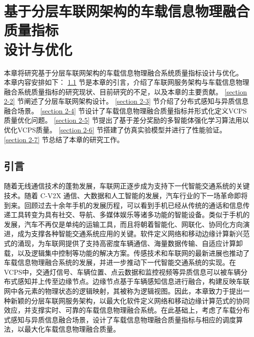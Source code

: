 \chapter[基于分层车联网架构的车载信息物理融合质量指标设计与优化]{基于分层车联网架构的车载信息物理融合质量指标\\设计与优化}
本章将研究基于分层车联网架构的车载信息物理融合系统质量指标设计与优化。
本章内容安排如下：
\ref{section 2-1} 节是本章的引言，介绍了车联网服务架构与车载信息物理融合系统质量指标的研究现状、目前研究的不足，以及本章的主要贡献。
\ref{section 2-2} 节阐述了分层车联网架构设计。
\ref{section 2-3} 节介绍了分布式感知与异质信息融合场景。
\ref{section 2-4} 节设计了车载信息物理融合质量指标并形式化定义VCPS质量优化问题。
\ref{section 2-5} 节提出了基于差分奖励的多智能体强化学习算法用以优化VCPS质量。
\ref{section 2-6} 节搭建了仿真实验模型并进行了性能验证。
\ref{section 2-7} 节总结了本章的研究工作。

\section{引言}\label{section 2-1}

随着无线通信技术的蓬勃发展，车联网正逐步成为支持下一代智能交通系统的关键技术。随着 C-V2X 通信、大数据和人工智能的发展，汽车行业的下一场革命即将到来。回顾过去十余年手机的发展历程，可以看到手机已经从传统的通话和信息传递工具转变为具有社交、导航、多媒体娱乐等诸多功能的智能设备。类似于手机的发展，汽车不再仅是单纯的运输工具，而且将朝着智能化、网联化、协同化方向演进，成为支撑各种智能交通系统应用的关键。软件定义网络\cite{li2021zhi}和移动边缘计算\cite{liu2022fedcpf}新兴范式的涌现，为车联网提供了支持高密度车辆通信、海量数据传输、自适应计算卸载，以及逻辑集中控制等功能的解决方案。传感技术和车联网的最新进展也推动了车载信息物理融合系统的发展，并进一步推动下一代智能交通系统的实现。在VCPS中，交通灯信号、车辆位置、点云数据和监控视频等异质信息可以被车辆分布式感知并上传至边缘节点。边缘节点基于车辆感知信息进行融合，构建反映车联网中各元素的物理状态的逻辑映射，其被称为逻辑视图。因此，本章致力于提出一种新颖的分层车联网服务架构，以最大化软件定义网络和移动边缘计算范式的协同效应，并支撑实时、可靠的车载信息物理融合系统。在此基础上，考虑了车载分布式感知与异质信息融合场景，设计了车载信息物理融合质量指标与相应的调度算法，以最大化车载信息物理融合质量。

